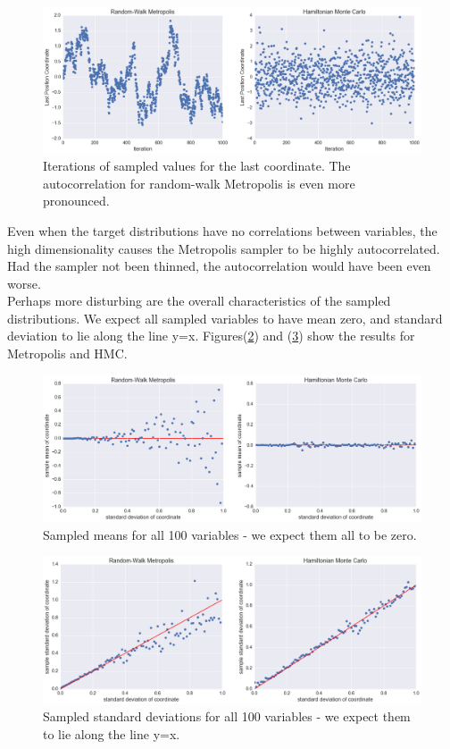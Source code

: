 \documentclass{article}
\numberwithin{equation}{section}
\begin{document}
\begin{figure}[H]
\centering
  \includegraphics[width=1\linewidth]{100d_iterations.png}
  \caption{Iterations of sampled values for the last coordinate. The autocorrelation for random-walk Metropolis is even more pronounced.}
\label{100d_iters}
\end{figure}

Even when the target distributions have no correlations between variables, the high dimensionality causes the Metropolis sampler to be highly autocorrelated. Had the sampler not been thinned, the autocorrelation would have been even worse.\\

Perhaps more disturbing are the overall characteristics of the sampled distributions. We expect all sampled variables to have mean zero, and standard deviation to lie along the line y=x. Figures(\ref{100d_means}) and (\ref{100d_sds}) show the results for Metropolis and HMC.

\begin{figure}[H]
\centering
  \includegraphics[width=1\linewidth]{100d_means.png}
  \caption{Sampled means for all 100 variables - we expect them all to be zero.}
\label{100d_means}
\end{figure}

\begin{figure}[H]
\centering
  \includegraphics[width=1\linewidth]{100d_sds.png}
  \caption{Sampled standard deviations for all 100 variables - we expect them to lie along the line y=x.}
\label{100d_sds}
\end{figure}
\end{document}
